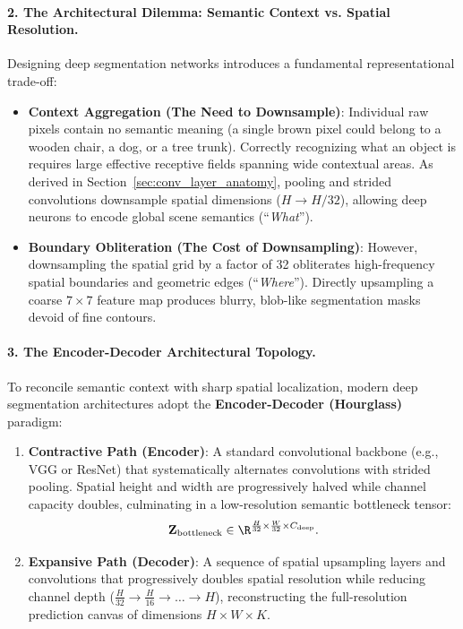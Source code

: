 \paragraph{2. The Architectural Dilemma: Semantic Context vs. Spatial Resolution.}
Designing deep segmentation networks introduces a fundamental representational trade-off:
\begin{itemize}[leftmargin=*]
  \item \textbf{Context Aggregation (The Need to Downsample)}: Individual raw pixels contain no semantic meaning (a single brown pixel could belong to a wooden chair, a dog, or a tree trunk). Correctly recognizing what an object is requires large effective receptive fields spanning wide contextual areas. As derived in Section~\ref{sec:conv_layer_anatomy}, pooling and strided convolutions downsample spatial dimensions ($H \to H/32$), allowing deep neurons to encode global scene semantics (``\textit{What}'').
  \item \textbf{Boundary Obliteration (The Cost of Downsampling)}: However, downsampling the spatial grid by a factor of 32 obliterates high-frequency spatial boundaries and geometric edges (``\textit{Where}''). Directly upsampling a coarse $7 \times 7$ feature map produces blurry, blob-like segmentation masks devoid of fine contours.
\end{itemize}

\paragraph{3. The Encoder-Decoder Architectural Topology.}
To reconcile semantic context with sharp spatial localization, modern deep segmentation architectures adopt the \textbf{Encoder-Decoder (Hourglass)} paradigm:
\begin{enumerate}[leftmargin=*]
  \item \textbf{Contractive Path (Encoder)}: A standard convolutional backbone (e.g., VGG or ResNet) that systematically alternates convolutions with strided pooling. Spatial height and width are progressively halved while channel capacity doubles, culminating in a low-resolution semantic bottleneck tensor:
    \begin{equation}
    \mathbf{Z}_{\text{bottleneck}} \in \R^{\frac{H}{32} \times \frac{W}{32} \times C_{\text{deep}}}.
    \end{equation}
  \item \textbf{Expansive Path (Decoder)}: A sequence of spatial upsampling layers and convolutions that progressively doubles spatial resolution while reducing channel depth ($\frac{H}{32} \to \frac{H}{16} \to \dots \to H$), reconstructing the full-resolution prediction canvas of dimensions $H \times W \times K$.
\end{enumerate}

